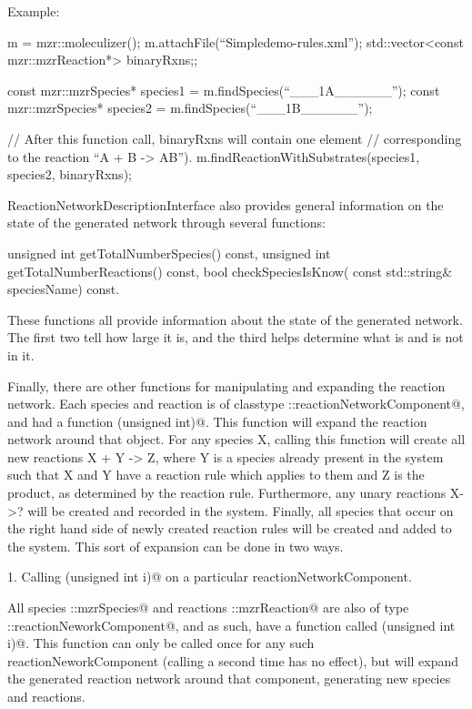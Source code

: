 Example:
\begin{ExampleCPP}
m = mzr::moleculizer();
m.attachFile(``Simpledemo-rules.xml'');
std::vector<const mzr::mzrReaction*> binaryRxns;;

const mzr::mzrSpecies* species1 = m.findSpecies(``___1A______'');
const mzr::mzrSpecies* species2 = m.findSpecies(``___1B______'');

// After this function call, binaryRxns will contain one element
// corresponding to the reaction ``A + B -> AB'').
m.findReactionWithSubstrates(species1, species2, binaryRxns);


ReactionNetworkDescriptionInterface also provides general information
on the state of the generated network through several functions:

unsigned int getTotalNumberSpecies() const, 
unsigned int getTotalNumberReactions() const,
bool checkSpeciesIsKnow( const std::string& speciesName) const.
\end{ExampleCPP}

These functions all provide information about the state of the
generated network.  The first two tell how large it is, and the third
helps determine what is and is not in it.  

Finally, there are other functions for manipulating and expanding the
reaction network.  Each species and reaction is of classtype
\lstinline@fnd::reactionNetworkComponent@, and had a function
\lstinline@expandReactionNetwork(unsigned int)@.  This function will expand the
reaction network around that object.  For any species X, calling this
function will create all new reactions X + Y -> Z, where Y is a species
already present in the system such that X and Y have a reaction rule
which applies to them and Z is the product, as determined by the
reaction rule.  Furthermore, any unary reactions X->? will be created
and recorded in the system.  Finally, all species that occur on the
right hand side of newly created reaction rules will be created and
added to the system.  This sort of expansion can be done in two ways.

1.  Calling \lstinline@expandReactionNetwork(unsigned int i)@ on a particular
reactionNetworkComponent.

All species \lstinline@mzr::mzrSpecies@ and reactions \lstinline@mzr::mzrReaction@ are
also of type \lstinline@fnd::reactionNeworkComponent@, and as such, have a function
called \lstinline@expandReactionNetwork(unsigned int i)@.  This function can only
be called once for any such reactionNeworkComponent (calling a second
time has no effect), but will expand the generated reaction network
around that component, generating new species and reactions.



